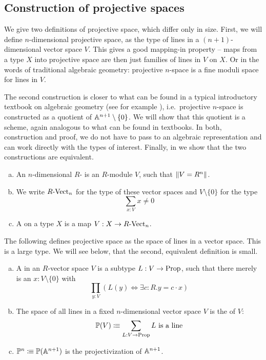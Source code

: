 
\subsection{Construction of projective spaces}
We give two definitions of projective space, which differ only in size.
First, we will define $n$-dimensional projective space,
as the type of lines in a $(n+1)$-dimensional vector space $V$.
This gives a good mapping-in property --
maps from a type $X$ into projective space are then just families of lines in $V$ on $X$.
Or in the words of traditional algebraic geometry:
projective $n$-space is a fine moduli space for lines in $V$.

The second construction is closer to what can be found in a typical
introductory textbook on algebraic geometry
(see for example \cite[Section I.2]{Hartshorne}),
i.e.\ projective $n$-space is constructed as a quotient of $\mathbb{A}^{n+1}\setminus\{0\}$.
We will show that this quotient is a scheme,
again analogous to what can be found in textbooks.
In both, construction and proof,
we do not have to pass to an algebraic representation
and can work directly with the types of interest.
Finally, in 
we show that the two constructions are equivalent.

\begin{definition}%
  \begin{enumerate}[(a)]
  \item An $n$-dimensional $R$- is an $R$-module $V$,
    such that $\lVert  V = R^n  \rVert$. 
  \item We write $R\text{-}\mathrm{Vect}_{n}$ for the type of these vector spaces and $V\setminus\{0\}$ for the type
    \[ \sum_{x:V}x\neq 0\]
  \item A  on a type $X$ is a map $V:X\to R\text{-}\mathrm{Vect}_{n}$. 
  \end{enumerate}
\end{definition}

The following defines projective space as the space of lines in a vector space.
This is a large type.
We will see below, that the second, equivalent definition is small.

\begin{definition}%
  \label{projective-space-as-space-of-lines}
  \begin{enumerate}[(a)]
  \item A  in an $R$-vector space $V$ is a subtype $L:V\to \mathrm{Prop}$,
    such that there merely is an $x:V\setminus\{0\}$ with
    \[ \prod_{y:V}\left(L (y) \Leftrightarrow \exists c:R.y=c\cdot x\right)\]
  \item The space of all lines in a fixed $n$-dimensional vector space $V$ is the  of $V$:
    \[ \mathbb{P}(V)\vcentcolon\mspace{-1.2mu}\equiv \sum_{L:V\to \mathrm{Prop}} L \text{ is a line}  \]
  \item {} $\mathbb{P}^n \vcentcolon\mspace{-1.2mu}\equiv \mathbb{P}(\mathbb{A}^{n+1})$ is the projectivization of $\mathbb{A}^{n+1}$.
  \end{enumerate}
\end{definition}

